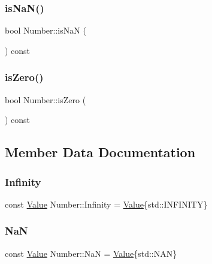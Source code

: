 \subsubsection{\texorpdfstring{is\+Na\+N()}{isNaN()}}
{\footnotesize\ttfamily bool Number\+::is\+NaN (\begin{DoxyParamCaption}{ }\end{DoxyParamCaption}) const\hspace{0.3cm}{\ttfamily [inline]}}

\mbox{\label{struct_number_a81a3c3689b85c8fe4ad70a275c8ba1b6}} 
\subsubsection{\texorpdfstring{is\+Zero()}{isZero()}}
{\footnotesize\ttfamily bool Number\+::is\+Zero (\begin{DoxyParamCaption}{ }\end{DoxyParamCaption}) const\hspace{0.3cm}{\ttfamily [inline]}}



\subsection{Member Data Documentation}
\mbox{\label{struct_number_a78c5c53ddee47730fcbd10ad1af7c8ba}} 
\subsubsection{\texorpdfstring{Infinity}{Infinity}}
{\footnotesize\ttfamily const \hyperlink{value_8h_a1882706e4f2d631f705767ad4a973ee5}{Value} Number\+::\+Infinity = \hyperlink{value_8h_a1882706e4f2d631f705767ad4a973ee5}{Value}\{std\+::\+I\+N\+F\+I\+N\+I\+TY\}\hspace{0.3cm}{\ttfamily [static]}}

\mbox{\label{struct_number_ae46de0f8d37f02b00dd6fa77a79af1f9}} 
\subsubsection{\texorpdfstring{NaN}{NaN}}
{\footnotesize\ttfamily const \hyperlink{value_8h_a1882706e4f2d631f705767ad4a973ee5}{Value} Number\+::\+NaN = \hyperlink{value_8h_a1882706e4f2d631f705767ad4a973ee5}{Value}\{std\+::\+N\+AN\}\hspace{0.3cm}{\ttfamily [static]}}

